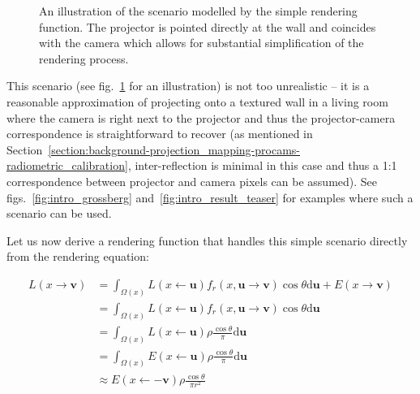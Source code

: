 \begin{figure}[]
    \centering
    \def\svgwidth{0.6\textwidth}
    
    \caption{An illustration of the scenario modelled by the simple rendering function. The projector is pointed directly at the wall and coincides with the camera which allows for substantial simplification of the rendering process.}
    \label{fig:methods_simple_scenario}
\end{figure}

This scenario (see fig.~\ref{fig:methods_simple_scenario} for an illustration) is not too unrealistic -- it is a reasonable approximation of projecting onto a textured wall in a living room where the camera is right next to the projector and thus the projector-camera correspondence is straightforward to recover (as mentioned in Section~\ref{section:background-projection_mapping-procams-radiometric_calibration}, inter-reflection is minimal in this case and thus a 1:1 correspondence between projector and camera pixels can be assumed). See figs.~\ref{fig:intro_grossberg} and~\ref{fig:intro_result_teaser} for examples where such a scenario can be used.

Let us now derive a rendering function that handles this simple scenario directly from the rendering equation:

\begin{align}
    L(x \rightarrow \mathbf{v}) &= \int_{\Omega(x)} L(x \leftarrow \mathbf{u}) f_r(x, \mathbf{u} \rightarrow \mathbf{v}) \cos \theta \mathrm{d}\mathbf{u} + E(x \rightarrow \mathbf{v}) \label{eq:simple_x_from_rendering_eq01} \\
    &= \int_{\Omega(x)} L(x \leftarrow \mathbf{u}) f_r(x, \mathbf{u} \rightarrow \mathbf{v}) \cos \theta \mathrm{d}\mathbf{u} \label{eq:simple_x_from_rendering_eq02} \\
    &= \int_{\Omega(x)} L(x \leftarrow \mathbf{u}) \rho \frac{\cos \theta}{\pi} \mathrm{d}\mathbf{u} \label{eq:simple_x_from_rendering_eq03} \\
    &= \int_{\Omega(x)} E(x \leftarrow \mathbf{u}) \rho \frac{\cos \theta}{\pi} \mathrm{d}\mathbf{u} \label{eq:simple_x_from_rendering_eq04} \\
    &\approx E(x \leftarrow \mathbf{-v}) \rho \frac{\cos \theta}{\pi r^2} \label{eq:simple_x_from_rendering_eq05}
\end{align}

